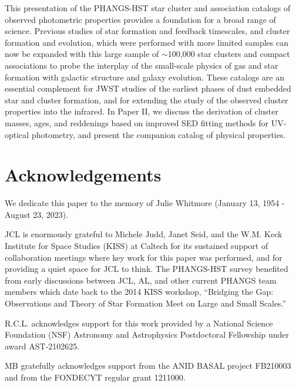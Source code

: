 \documentclass[linenumbers]{aastex63}
\begin{document}
This presentation of the PHANGS-HST star cluster and association catalogs of observed photometric properties provides a foundation for a broad range of science. Previous studies of star formation and feedback timescales, and cluster formation and evolution, which were performed with {more limited samples} can now be expanded {with this large sample of $\sim$100,000 star clusters and compact associations} to probe the interplay of the small-scale physics of gas and star formation with galactic structure and galaxy evolution.  These catalogs are an essential complement for JWST studies of the earliest phases of dust embedded star and cluster formation, and for extending the study of the observed cluster properties into the infrared.  In Paper II, we discuss the derivation of cluster masses, ages, and reddenings based on improved SED fitting methods for UV-optical photometry, and present the companion catalog of physical properties.  





 



















\section*{Acknowledgements}
We dedicate this paper to the memory of Julie Whitmore (January 13, 1954 - August 23, 2023).

JCL is enormously grateful to Michele Judd, Janet Seid, and the W.M. Keck Institute for Space Studies (KISS) at Caltech for its sustained support of collaboration meetings where key work for this paper was performed, and for providing a quiet space for JCL to think.  The PHANGS-HST survey benefited from early discussions between JCL, AL, and other current PHANGS team members which date back to the 2014 KISS workshop, ``Bridging the Gap: Observations and Theory of Star Formation Meet on Large and Small Scales.''

R.C.L. acknowledges support for this work provided by a National Science Foundation (NSF) Astronomy and Astrophysics Postdoctoral Fellowship under award AST-2102625.

MB gratefully acknowledges support from the ANID BASAL project FB210003 and from the FONDECYT regular grant 1211000.
\end{document}
